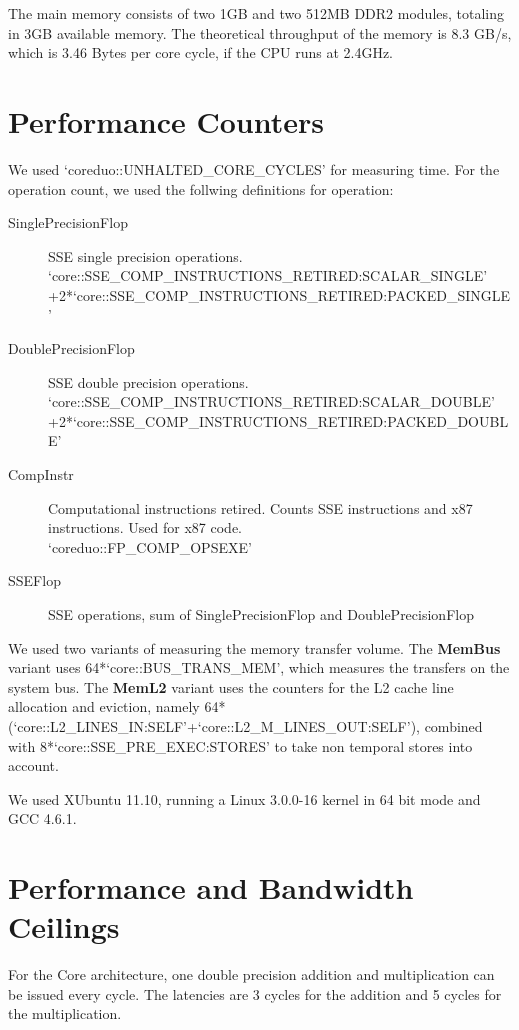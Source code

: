 \documentclass[a4paper,12pt]{report}
\begin{document}
The main memory consists of two 1GB and two 512MB DDR2 modules, totaling in 3GB
available memory. The theoretical throughput of the memory is 8.3 GB/s, which is
3.46 Bytes per core cycle, if the CPU runs at 2.4GHz.

\section{Performance Counters}
We used `coreduo::UNHALTED\_CORE\_CYCLES' for measuring time. For the operation
count, we used the follwing definitions for operation: 
\begin{description}
\item[SinglePrecisionFlop] SSE single precision operations.
\\{\footnotesize
`core::SSE\_COMP\_INSTRUCTIONS\_RETIRED:SCALAR\_SINGLE'\\
+2*`core::SSE\_COMP\_INSTRUCTIONS\_RETIRED:PACKED\_SINGLE'}
\item[DoublePrecisionFlop] SSE double precision operations.
\\{\footnotesize
`core::SSE\_COMP\_INSTRUCTIONS\_RETIRED:SCALAR\_DOUBLE'\\
+2*`core::SSE\_COMP\_INSTRUCTIONS\_RETIRED:PACKED\_DOUBLE'}
\item[CompInstr] Computational instructions retired. Counts SSE instructions
and x87 instructions. Used for x87 code. 
\\{\footnotesize `coreduo::FP\_COMP\_OPSEXE'}
\item[SSEFlop] SSE operations, sum of SinglePrecisionFlop and
DoublePrecisionFlop
\end{description}

We used two variants of measuring the memory transfer volume. The {\bf MemBus}
variant uses 64*`core::BUS\_TRANS\_MEM', which measures the transfers on the
system bus. The {\bf MemL2} variant uses the counters for the L2 cache line
allocation and eviction, namely
64*(`core::L2\_LINES\_IN:SELF'+`core::L2\_M\_LINES\_OUT:SELF'), combined
with 8*`core::SSE\_PRE\_EXEC:STORES' to take non temporal stores
into account.

We used XUbuntu 11.10, running a Linux 3.0.0-16 kernel in 64 bit mode and GCC
4.6.1.

\section{Performance and Bandwidth Ceilings}
For the Core architecture, one double precision addition and multiplication can
be issued every cycle. The latencies are 3 cycles for
the addition and 5 cycles for the multiplication. \cite{inteloptimize} 
\end{document}
